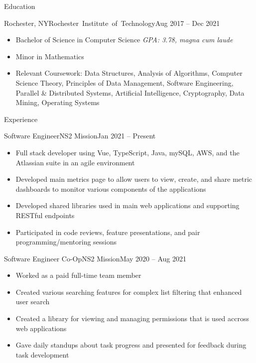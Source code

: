 \documentclass[]{mcdowellcv}
\begin{document}
	\makeheader
	
	\begin{cvsection}{Education}
		\begin{cvsubsection}{Rochester, NY}{\mbox{Rochester Institute of Technology}}{Aug 2017 -- Dec 2021}
			\begin{itemize}
				\item Bachelor of Science in Computer Science \hfill \textit{GPA: 3.78, magna cum laude}
				\item Minor in Mathematics
				\item Relevant Coursework: Data Structures, Analysis of Algorithms, Computer Science Theory, Principles of Data Management, Software Engineering, Parallel \& Distributed Systems, Artificial Intelligence, 
				Cryptography, Data Mining, Operating Systems
			\end{itemize}
		\end{cvsubsection}
	\end{cvsection}

	\begin{cvsection}{Experience}
		\begin{cvsubsection}{Software Engineer}{NS2 Mission}{Jan 2021 -- Present}	
			\begin{itemize}
				\item Full stack developer using Vue, TypeScript, Java, mySQL, AWS, and the Atlassian suite in an agile environment
				\item Developed main metrics page to allow users to view, create, and share metric dashboards to monitor various components of the applications
				\item Developed shared libraries used in main web applications and supporting RESTful endpoints
				\item Participated in code reviews, feature presentations, and pair programming/mentoring sessions
			\end{itemize}
		\end{cvsubsection}

		\begin{cvsubsection}{Software Engineer Co-Op}{NS2 Mission}{May 2020 -- Aug 2021}	
			\begin{itemize}
				\item Worked as a paid full-time team member
				\item Created various searching features for complex list filtering that enhanced user search
				\item Created a library for viewing and managing permissions that is used accross web applications
				\item Gave daily standups about task progress and presented for feedback during task development
			\end{itemize}
		\end{cvsubsection}
	\end{cvsection}
	
\end{document}
